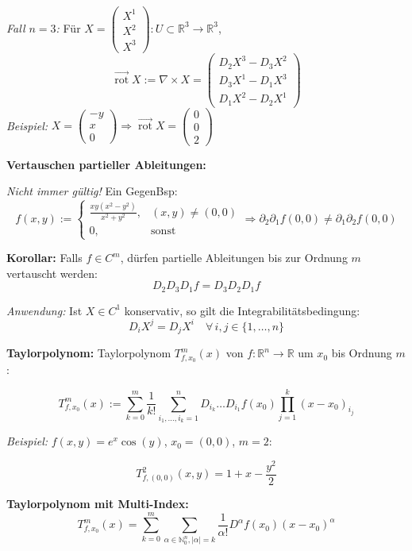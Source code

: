 \textit{Fall \(n=3\):} Für \( X = \begin{pmatrix} X^1 \\ X^2 \\ X^3 \end{pmatrix} : U \subset \mathbb{R}^3 \to \mathbb{R}^3 \),
\[
\vec{\operatorname{rot}} X := \nabla \times X = \begin{pmatrix}
D_2 X^3 - D_3 X^2 \\
D_3 X^1 - D_1 X^3 \\
D_1 X^2 - D_2 X^1
\end{pmatrix}
\]
\textit{Beispiel:} \( X = \begin{pmatrix} -y \\ x \\ 0 \end{pmatrix} \Rightarrow \vec{\operatorname{rot}} X = \begin{pmatrix} 0 \\ 0 \\ 2 \end{pmatrix} \)

\textbf{Vertauschen partieller Ableitungen:}

\textit{Nicht immer gültig!} Ein GegenBsp:
\[
f(x,y) := \begin{cases}
\frac{xy(x^2 - y^2)}{x^2 + y^2}, & (x,y)\neq(0,0) \\
0, & \text{sonst}
\end{cases}
\Rightarrow \partial_2 \partial_1 f(0,0) \ne \partial_1 \partial_2 f(0,0)
\]

\textbf{Korollar:} Falls \(f \in C^m\), dürfen partielle Ableitungen bis zur Ordnung \(m\) vertauscht werden:
\[
D_2 D_3 D_1 f = D_3 D_2 D_1 f
\]

\textit{Anwendung:} Ist \(X \in C^1\) konservativ, so gilt die Integrabilitätsbedingung:
\[
D_i X^j = D_j X^i \quad \forall\, i,j \in \{1,\dots,n\}
\]

\textbf{Taylorpolynom:} Taylorpolynom $T_{f,x_0}^m(x)$ von $f: \mathbb{R}^n \to \mathbb{R}$ um $x_0$ bis Ordnung $m$:

\[
T_{f,x_0}^m(x) := \sum_{k=0}^{m} \frac{1}{k!} \sum_{i_1,\dots,i_k=1}^{n} D_{i_k} \dots D_{i_1}f(x_0) \prod_{j=1}^{k}(x - x_0)_{i_j}
\]

\textit{Beispiel:} $f(x,y) = e^x\cos(y)$, $x_0 = (0,0)$, $m = 2$:

\[
T_{f,(0,0)}^2(x,y) = 1 + x - \frac{y^2}{2}
\]

\textbf{Taylorpolynom mit Multi-Index:}
\[
T^m_{f,x_0}(x) = \sum_{k=0}^m \sum_{\alpha \in \mathbb{N}_0^n, |\alpha| = k} \frac{1}{\alpha!} D^\alpha f(x_0) (x - x_0)^\alpha
\]

